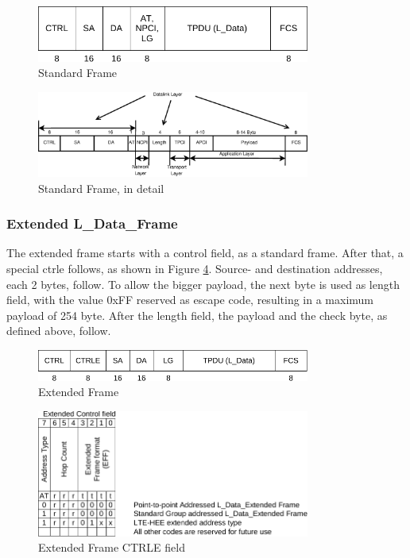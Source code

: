 \begin{figure}
    \centering
    \includegraphics[width=0.8\textwidth]{figures/standardframe}
    \caption{Standard Frame}
    \label{fig:stdframe}
\end{figure}

\begin{figure}
    \centering
    \includegraphics[width=0.8\textwidth]{figures/standardFrame.eps}
    \caption{Standard Frame, in detail}
    \label{fig:stdFrameDetail}
\end{figure}


\subsubsection{Extended L\_Data\_Frame}

The extended frame starts with a control field, as a standard frame. After that, a special \gls{ctrle} follows, as shown in Figure \ref{fig:ctrle}.
Source- and destination addresses, each 2 bytes, follow. To allow the bigger payload, the next byte is used as length field, with the value 0xFF reserved
as escape code, resulting in a maximum payload of 254 byte. After the length field, the payload and the check byte, as defined above, follow.

\begin{figure}
    \centering
    \includegraphics[width=0.8\textwidth]{figures/extendedframe}
    \caption{Extended Frame}
    \label{fig:extframe}
\end{figure}

\begin{figure}
    \centering
    \includegraphics[width=0.8\textwidth]{figures/CTRLE}
    \caption{Extended Frame CTRLE field}
    \label{fig:ctrle}
\end{figure}

